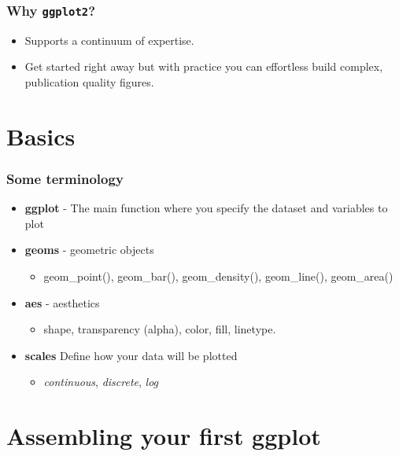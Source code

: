 \documentclass{beamer}\usepackage[]{graphicx}\usepackage[]{color}
\begin{document}
\begin{frame}[fragile]
\frametitle{Why \texttt{ggplot2}?}
\begin{itemize}
\item  Supports a continuum of expertise.
\item Get started right away but with practice you can effortless build complex, publication quality figures.
\end{itemize}
\end{frame}

\section*{Basics}
\frame{\sectionpage}


\begin{frame}[fragile]
\frametitle{Some terminology}
\begin{itemize}
\item \textbf{ggplot} - The main function where you specify the dataset and variables to plot\\
\item \textbf{geoms} - geometric objects
    \begin{itemize}
    \item geom\_point(), geom\_bar(), geom\_density(), geom\_line(), geom\_area()
    \end{itemize}
\item \textbf{aes} -  aesthetics
        \begin{itemize}
    \item shape, transparency (alpha), color, fill, linetype.
    \end{itemize}
\item \textbf{scales}  Define how your data will be plotted
        \begin{itemize}
    \item \emph{continuous}, \emph{discrete}, \emph{log}
    \end{itemize}
\end{itemize}
\end{frame}


\section*{Assembling your first ggplot}
\frame{\sectionpage}
\end{document}
